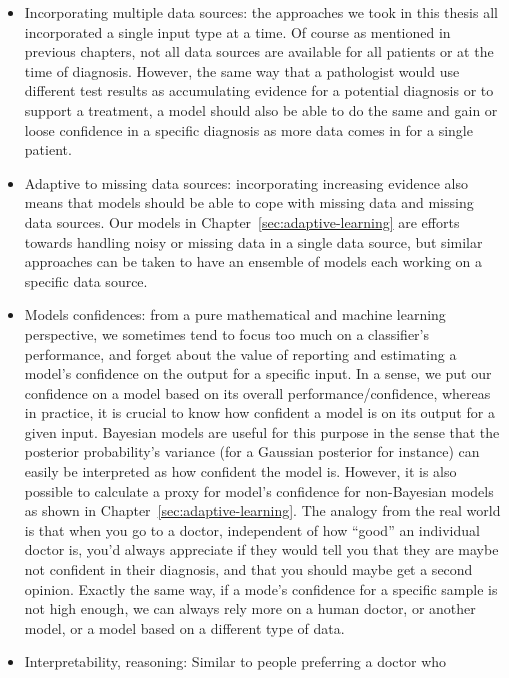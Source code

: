 \begin{itemize}
  \item Incorporating multiple data sources: the approaches we took in this
    thesis all incorporated a single input type at a time. Of course as
    mentioned in previous chapters, not all data sources are available for all
    patients or at the time of diagnosis. However, the same way that a
    pathologist would use different test results as accumulating evidence for a
    potential diagnosis or to support a treatment, a model should also be able
    to do the same and gain or loose confidence in a specific diagnosis as more
    data comes in for a single patient.
  \item Adaptive to missing data sources: incorporating increasing evidence
    also means that models should be able to cope with missing data and missing
    data sources. Our models in Chapter~\ref{sec:adaptive-learning} are efforts
    towards handling noisy or missing data in a single data source, but similar
    approaches can be taken to have an ensemble of models each working on a
    specific data source.
  \item Models confidences: from a pure mathematical and machine learning
    perspective, we sometimes tend to focus too much on a classifier's
    performance, and forget about the value of reporting and estimating a
    model's confidence on the output for a specific input. In a sense, we put
    our confidence on a model based on its overall performance/confidence,
    whereas in practice, it is crucial to know how confident a model is on its
    output for a given input. Bayesian models are useful for this purpose in
    the sense that the posterior probability's variance (for a Gaussian
    posterior for instance) can easily be interpreted as how confident the
    model is. However, it is also possible to calculate a proxy for model's
    confidence for non-Bayesian models as shown in
    Chapter~\ref{sec:adaptive-learning}. The analogy from the real world is
    that when you go to a doctor, independent of how ``good'' an individual
    doctor is, you'd always appreciate if they would tell you that they are
    maybe not confident in their diagnosis, and that you should maybe get a
    second opinion. Exactly the same way, if a mode's confidence for a specific
    sample is not high enough, we can always rely more on a human doctor, or
    another model, or a model based on a different type of data.
  \item Interpretability, reasoning: Similar to people preferring a doctor who

\end{itemize}
